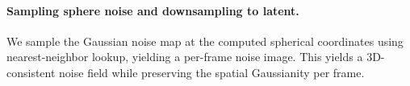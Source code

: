\paragraph{Sampling sphere noise and downsampling to latent.}
We sample the Gaussian noise map at the computed spherical coordinates using nearest-neighbor lookup,
yielding a per-frame noise image.
This yields a 3D-consistent noise field while preserving the spatial Gaussianity per frame.

